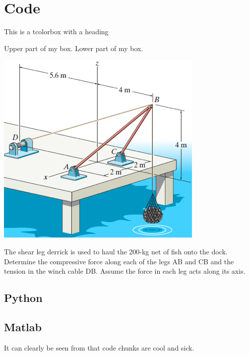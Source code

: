 \section{Code}

\begin{tcolorbox}[colback=red!5!white,colframe=red!50!black,title=My nice heading]
    This is a tcolorbox with a heading
\end{tcolorbox}

\begin{tcolorbox}[colback=green!5!white,colframe=green!75!black]
    Upper part of my box.
    \tcblower
    Lower part of my box.
\end{tcolorbox}

\begin{tcolorbox}[title=Statics Problem Example, colback=white!95!black,colframe=black!70!white,colbacktitle=black!10!white, coltitle=black, fonttitle=\bfseries, coltext=black]
    \begin{center}
        \includegraphics[width=0.5\linewidth]{photos/statics_problem.png}
    \end{center}
    The shear leg derrick is used to haul the 200-kg net of fish onto the dock. Determine the compressive force along each of the legs AB and CB and the tension in the winch cable DB. Assume the force in each leg acts along its axis.
\end{tcolorbox}
    

\subsection{Python}
    
\newpage

\subsection{Matlab}
    
    It can clearly be seen from  that code chunks are cool and sick.


    
    
